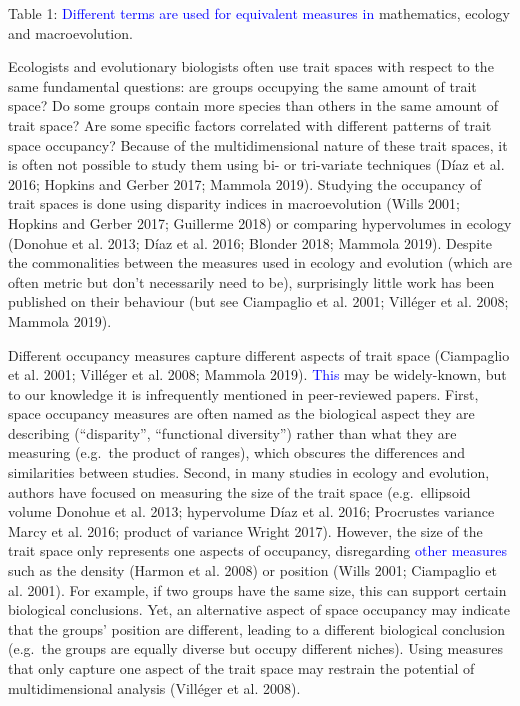 \documentclass[]{article}
\begin{document}
Table 1: \textcolor{blue}{Different terms are used for
equivalent measures in} mathematics, ecology and macroevolution.

\renewcommand\baselinestretch{1.6}\selectfont

Ecologists and evolutionary biologists often use trait spaces with
respect to the same fundamental questions: are groups occupying the same
amount of trait space? Do some groups contain more species than others
in the same amount of trait space? Are some specific factors correlated
with different patterns of trait space occupancy? Because of the
multidimensional nature of these trait spaces, it is often not possible
to study them using bi- or tri-variate techniques (Díaz et al. 2016;
Hopkins and Gerber 2017; Mammola 2019). Studying the occupancy of trait
spaces is done using disparity indices in macroevolution (Wills 2001;
Hopkins and Gerber 2017; Guillerme 2018) or comparing hypervolumes in
ecology (Donohue et al. 2013; Díaz et al. 2016; Blonder 2018; Mammola
2019). Despite the commonalities between the measures used in ecology
and evolution (which are often metric but don't necessarily need to be),
surprisingly little work has been published on their behaviour (but see
Ciampaglio et al. 2001; Villéger et al. 2008; Mammola 2019).

Different occupancy measures capture different aspects of trait space
(Ciampaglio et al. 2001; Villéger et al. 2008; Mammola 2019).
\textcolor{blue}{This} may be widely-known, but to
our knowledge it is infrequently mentioned in peer-reviewed papers.
First, space occupancy measures are often named as the biological aspect
they are describing (``disparity'', ``functional diversity'') rather
than what they are measuring (e.g.~the product of ranges), which
obscures the differences and similarities between studies. Second, in
many studies in ecology and evolution, authors have focused on measuring
the size of the trait space (e.g.~ellipsoid volume Donohue et al. 2013;
hypervolume Díaz et al. 2016; Procrustes variance Marcy et al. 2016;
product of variance Wright 2017). However, the size of the trait space
only represents one aspects of occupancy, disregarding
\textcolor{blue}{other measures} such as the density
(Harmon et al. 2008) or position (Wills 2001; Ciampaglio et al. 2001).
For example, if two groups have the same size, this can support certain
biological conclusions. Yet, an alternative aspect of space occupancy
may indicate that the groups' position are different, leading to a
different biological conclusion (e.g.~the groups are equally diverse but
occupy different niches). Using measures that only capture one aspect of
the trait space may restrain the potential of multidimensional analysis
(Villéger et al. 2008).
\end{document}
